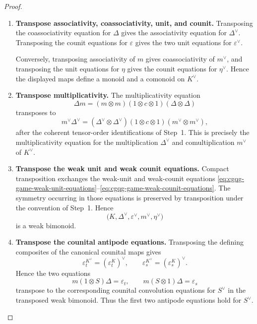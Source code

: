 \documentclass[oneside]{article}
\theoremstyle{plain}
\theoremstyle{definition}
\theoremstyle{remark}
\begin{document}
\begin{proof}
\begin{enumerate}[beginpenalty=10000]
        Similarly,
        \[
            m^\vee:
            K\longrightarrow K\otimes K,
            \qquad
            \eta^\vee:
            K\longrightarrow I,
        \]
        so
        \[
            \Delta_{K^\vee}:=m^\vee,
            \qquad
            \varepsilon_{K^\vee}:=\eta^\vee
        \]
        have the types of comultiplication and counit.

        \item \textbf{Transpose associativity, coassociativity, unit,
        and counit.}
        Transposing the coassociativity equation for \(\Delta\) gives
        the associativity equation for \(\Delta^\vee\). Transposing the
        counit equations for \(\varepsilon\) gives the two unit
        equations for \(\varepsilon^\vee\).

        Conversely, transposing associativity of \(m\) gives
        coassociativity of \(m^\vee\), and transposing the unit equations
        for \(\eta\) gives the counit equations for \(\eta^\vee\).
        Hence the displayed maps define a monoid and a comonoid on
        \(K^\vee\).

        \item \textbf{Transpose multiplicativity.}
        The multiplicativity equation
        \[
            \Delta m
            =
            (m\otimes m)
            (1\otimes c\otimes1)
            (\Delta\otimes\Delta)
        \]
        transposes to
        \[
            m^\vee\Delta^\vee
            =
            (\Delta^\vee\otimes\Delta^\vee)
            (1\otimes c\otimes1)
            (m^\vee\otimes m^\vee),
        \]
        after the coherent tensor-order identifications of Step~1.
        This is precisely the multiplicativity equation for the
        multiplication \(\Delta^\vee\) and comultiplication \(m^\vee\)
        of \(K^\vee\).

        \item \textbf{Transpose the weak unit and weak counit equations.}
        Compact transposition exchanges the weak-unit and weak-counit equations \eqref{eq:cgqg-game-weak-unit-equations}--\eqref{eq:cgqg-game-weak-counit-equations}. The symmetry occurring in those equations is preserved by transposition under the convention of Step~1. Hence
        \[
            \bigl(
                K,
                \Delta^\vee,
                \varepsilon^\vee,
                m^\vee,
                \eta^\vee
            \bigr)
        \]
        is a weak bimonoid.

        \item \textbf{Transpose the counital antipode equations.}
        Transposing the defining composites of the canonical counital maps gives
        \[
            \varepsilon_t^{K^\vee}=(\varepsilon_t^K)^\vee,
            \qquad
            \varepsilon_s^{K^\vee}=(\varepsilon_s^K)^\vee.
        \]
        Hence the two equations
        \[
            m(1\otimes S)\Delta=\varepsilon_t,
            \qquad
            m(S\otimes1)\Delta=\varepsilon_s
        \]
        transpose to the corresponding counital convolution equations
        for \(S^\vee\) in the transposed weak bimonoid. Thus the first
        two antipode equations hold for \(S^\vee\).


\end{enumerate}
\end{proof}
\end{document}
